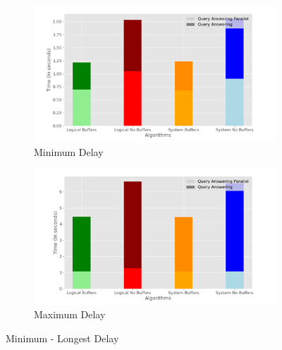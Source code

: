 \begin{figure}
	\centering
	\begin{subfigure}[c]{0.4\textwidth}
		\includegraphics[width=1\textwidth]   {figures/Experiments/Dynamic/Delays/shortest_delay.png}
		\caption{Minimum Delay}
		\label{fig:min-delay}
	\end{subfigure}
	\begin{subfigure}[c]{0.4\textwidth}
		\includegraphics[width=1\textwidth]   {figures/Experiments/Dynamic/Delays/longest_delay.png}
		\caption{Maximum Delay}
		\label{fig:max-delay}
	\end{subfigure}
	\caption{Minimum - Longest Delay}
	\label{fig:min-max-delay}
\end{figure}

